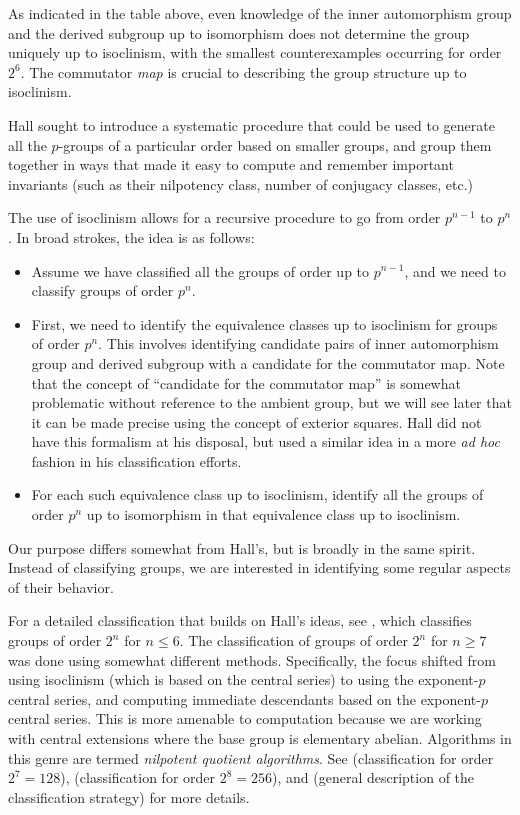 \documentclass{ucetd}
\begin{document}
As indicated in the table above, even knowledge of the inner
automorphism group and the derived subgroup up to isomorphism does not
determine the group uniquely up to isoclinism, with the smallest
counterexamples occurring for order $2^6$. The commutator {\em map} is
crucial to describing the group structure up to isoclinism.

Hall sought to introduce a systematic procedure that could be used to
generate all the $p$-groups of a particular order based on smaller
groups, and group them together in ways that made it easy to compute
and remember important invariants (such as their nilpotency class,
number of conjugacy classes, etc.)

The use of isoclinism allows for a recursive procedure to go from
order $p^{n-1}$ to $p^n$. In broad strokes, the idea is as follows:

\begin{itemize}
\item Assume we have classified all the groups of order up to
  $p^{n-1}$, and we need to classify groups of order $p^n$.

\item First, we need to identify the equivalence classes up to
  isoclinism for groups of order $p^n$. This involves identifying
  candidate pairs of inner automorphism group and derived subgroup
  with a candidate for the commutator map. Note that the concept of
  ``candidate for the commutator map'' is somewhat problematic without
  reference to the ambient group, but we will see later that it can be
  made precise using the concept of exterior squares. Hall did not
  have this formalism at his disposal, but used a similar idea in a
  more {\em ad hoc} fashion in his classification efforts.

\item For each such equivalence class up to isoclinism, identify all
  the groups of order $p^n$ up to isomorphism in that equivalence
  class up to isoclinism.

\end{itemize}

Our purpose differs somewhat from Hall's, but is broadly in the same
spirit. Instead of classifying groups, we are interested in
identifying some regular aspects of their behavior.

For a detailed classification that builds on Hall's ideas, see
\cite{HallSenior}, which classifies groups of order $2^n$ for $n \le
6$. The classification of groups of order $2^n$ for $n \ge 7$ was done
using somewhat different methods. Specifically, the focus shifted from
using isoclinism (which is based on the central series) to using the
exponent-$p$ central series, and computing immediate descendants based
on the exponent-$p$ central series. This is more amenable to
computation because we are working with central extensions where the
base group is elementary abelian. Algorithms in this genre are termed
{\em nilpotent quotient algorithms}. See \cite{Order128}
(classification for order $2^7 = 128$), \cite{Order256}
(classification for order $2^8 = 256$), and \cite{enumeratingpgroups}
(general description of the classification strategy) for more details.
\end{document}
